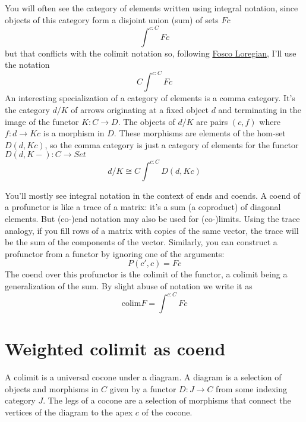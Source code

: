\documentclass[11pt]{amsart}
\begin{document}
You will often see the category of elements written using integral notation, since objects of this category form a disjoint union (sum) of sets $F c$
\[\int^{c \colon C} F c\]
but that conflicts with the colimit notation so, following \href{https://arxiv.org/abs/1501.02503}{Fosco Loregian}, I'll use the notation
\[C\int^{c \colon C} F c\]
An interesting specialization of a category of elements is a comma category. It's the category $d/K$ of arrows originating at a fixed object $d$ and terminating in the image of the functor $K \colon C \to D$. The objects of $d/K$ are pairs $(c, f)$ where $f \colon d \to K c$ is a morphism in $D$. These morphisms are elements of the hom-set $D(d, K c)$, so the comma category is just a category of elements for the functor $D(d, K-) \colon C \to Set$
\[d/K \cong C\int^{c\colon C} D(d, K c)\]

You'll mostly see integral notation in the context of ends and coends. A coend of a profunctor is like a trace of a matrix: it's a sum (a coproduct) of diagonal elements. But (co-)end notation may also be used for (co-)limits. Using the trace analogy, if you fill rows of a matrix with copies of the same vector, the trace will be the sum of the components of the vector. Similarly, you can construct a profunctor from a functor by ignoring one of the arguments:
\[ P(c', c) = F c\]
The coend over this profunctor is the colimit of the functor, a colimit being a generalization of the sum. By slight abuse of notation we write it as
\[ \mbox{colim} F = \int^{c \colon C} F c \]

\section{Weighted colimit as coend}
A colimit is a universal cocone under a diagram. A diagram is a selection of objects and morphisms in $C$ given by a functor $D \colon J \to C$ from some indexing category $J$. The legs of a cocone are a selection of morphisms that connect the vertices of the diagram to the apex $c$ of the cocone. 

\begin{figure}[H]
\end{figure}
\end{document}
